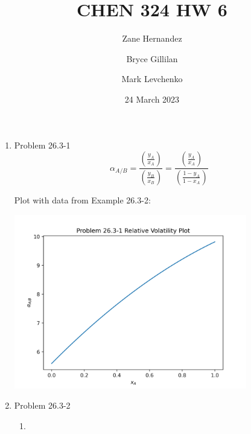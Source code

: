 \documentclass[12pt]{article}
\title{CHEN 324 HW 6}
\author[1]{Zane Hernandez}
\author[2]{Bryce Gillilan}
\author[3]{Mark Levchenko}
\affil[1,2,3]{Group 11}
\date{24 March 2023}
\begin{document}

\begin{enumerate}

\newpage
    \item Problem 26.3-1
    \[
        \alpha_{A/B} = \frac{\left(\frac{y_A}{x_A}\right)}{\left(\frac{y_B}{x_B}\right)} = \frac{\left(\frac{y_A}{x_A}\right)}{\left(\frac{1-y_A}{1-x_A}\right)}   
    \]

    Plot with data from Example 26.3-2:

    \begin{center}
        \includegraphics[width=0.8\textwidth]{assets/p1.png}
    \end{center}

\newpage
    \item Problem 26.3-2
    
    \begin{enumerate}
        \item 
        

\end{enumerate}
\end{enumerate}
\end{document}
